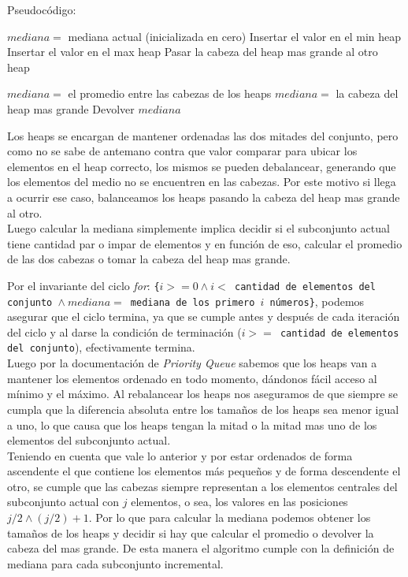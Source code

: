 Pseudocódigo:
\begin{algorithmic}
	\STATE $mediana =$ mediana actual (inicializada en cero)
			\STATE Insertar el valor en el min heap
		\ELSE
			\STATE Insertar el valor en el max heap
		\ENDIF
			\STATE Pasar la cabeza del heap mas grande al otro heap
		\ENDIF

			\STATE $mediana = $ el promedio entre las cabezas de los heaps
		\ELSE
			\STATE $mediana = $ la cabeza del heap mas grande
		\ENDIF
		\STATE Devolver $mediana$
	\ENDFOR
\end{algorithmic}


Los heaps se encargan de mantener ordenadas las dos mitades del conjunto, pero como no se sabe de antemano contra que valor comparar para ubicar los elementos en el heap correcto, los mismos se pueden debalancear, generando que los elementos del medio no se encuentren en las cabezas. Por este motivo si llega a ocurrir ese caso, balanceamos los heaps pasando la cabeza del heap mas grande al otro.\\

Luego calcular la mediana simplemente implica decidir si el subconjunto actual tiene cantidad par o impar de elementos y en función de eso, calcular el promedio de las dos cabezas o tomar la cabeza del heap mas grande.

Por el invariante del ciclo \emph{for}: \texttt{\{$i >= 0 \land i <$ cantidad de elementos del conjunto $\land\ mediana =$ mediana de los primero $i$ números\}}, podemos asegurar que el ciclo termina, ya que se cumple antes y después de cada iteración del ciclo y al darse la condición de terminación (\texttt{$i >=$ cantidad de elementos del conjunto}), efectivamente termina.\\

Luego por la documentación de \emph{Priority Queue} sabemos que los heaps van a mantener los elementos ordenado en todo momento, dándonos fácil acceso al mínimo y el máximo. Al rebalancear los heaps nos aseguramos de que siempre se cumpla que la diferencia absoluta entre los tamaños de los heaps sea menor igual a uno, lo que causa que los heaps tengan la mitad o la mitad mas uno de los elementos del subconjunto actual.\\

Teniendo en cuenta que vale lo anterior y por estar ordenados de forma ascendente el que contiene los elementos más pequeños y de forma descendente el otro, se cumple que las cabezas siempre representan a los elementos centrales del subconjunto actual con $j$ elementos, o sea, los valores en las posiciones $j/2 \land (j/2)+1$. Por lo que para calcular la mediana podemos obtener los tamaños de los heaps y decidir si hay que calcular el promedio o devolver la cabeza del mas grande. De esta manera el algoritmo cumple con la definición de mediana para cada subconjunto incremental.

